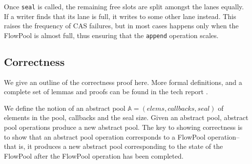 Once \verb=seal= is called, the remaining free slots
are split amongst the lanes equally.
If a writer finds that its lane is full,
it writes to some other lane instead.
This raises the frequency of CAS failures, but in most
cases happens only when the FlowPool is almost full,
thus ensuring that the \verb=append= operation scales.



\vspace{-0.3cm}
\subsection{Correctness}
\label{sec:correctness}
We give an outline of the correctness proof here. More formal
definitions, and a complete set of lemmas and proofs can be found
in the tech report \cite{Prokopec12}.

We define the notion of an abstract pool $\mathbb{A} = (elems,
callbacks, seal)$ of elements in the pool, callbacks and the seal
size.
Given an abstract pool, abstract pool operations produce a new
abstract pool.
The key to showing correctness is to show that an abstract pool operation
corresponds to a FlowPool operation-- that is, it produces a
new abstract pool corresponding to the state of the FlowPool after
the FlowPool operation has been completed.



%

